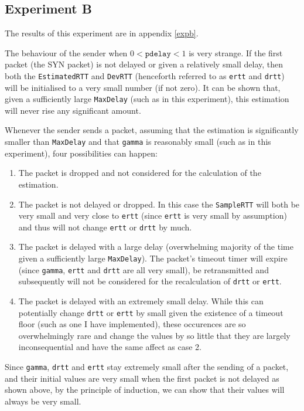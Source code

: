 \documentclass[a4paper]{article}
\begin{document}
\subsection{Experiment B}
The results of this experiment are in appendix \ref{expb}.

The behaviour of the sender when $0 < \texttt{pdelay} < 1$ is very strange. If the first packet (the SYN packet)
is not delayed or given a relatively small delay, then both the \texttt{EstimatedRTT} and \texttt{DevRTT} 
(henceforth referred to as \texttt{ertt}
and \texttt{drtt}) will be initialised to a very small number (if not zero). It can be shown that,
given a sufficiently large \texttt{MaxDelay} (such as in this experiment), this
estimation will never rise any significant amount. 

Whenever the sender sends a packet, assuming that the estimation is significantly smaller than 
\texttt{MaxDelay} and that \texttt{gamma} is reasonably small (such as in this experiment), four 
possibilities can happen:
\begin{enumerate}
	\item The packet is dropped and not considered for the calculation of the estimation.
	\item The packet is not delayed or dropped. In this case the \texttt{SampleRTT} will both be very small
		and very close to \texttt{ertt} (since \texttt{ertt} is very small by assumption) and thus will not
		change \texttt{ertt} or \texttt{drtt} by much.
	\item The packet is delayed with a large delay (overwhelming majority of the time given a sufficiently large
		\texttt{MaxDelay}). The packet's timeout timer will expire (since \texttt{gamma}, \texttt{ertt} and 
		\texttt{drtt} are all very small), be retransmitted and subsequently will not be considered for the
		recalculation of \texttt{drtt} or \texttt{ertt}.
	\item The packet is delayed with an extremely small delay. While this can potentially change \texttt{drtt}
		or \texttt{ertt} by small given the existence of a timeout floor (such as one I have implemented),
		these occurences are so overwhelmingly rare and change the values by so little that they are largely
		inconsequential and have the same affect as case 2.
\end{enumerate}

Since \texttt{gamma}, \texttt{drtt} and \texttt{ertt} stay extremely small after the sending of a packet,
and their initial values are very small when the first packet is not delayed as shown above, by the principle
of induction, we can show that their values will always be very small.
\end{document}
